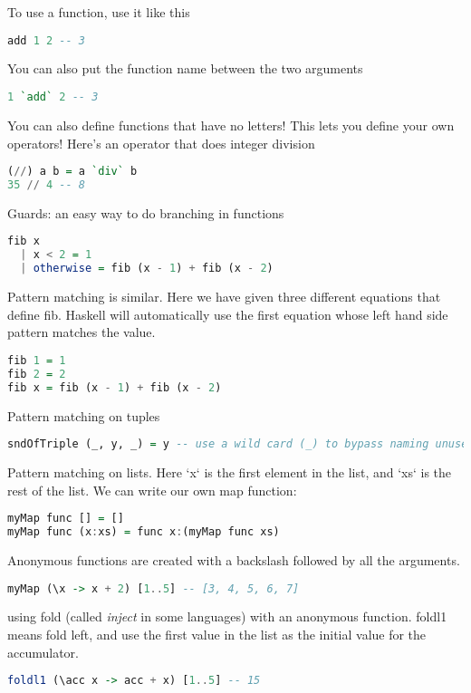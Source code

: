 To use a function, use it like this
\begin{lstlisting}[language=Haskell]
add 1 2 -- 3
\end{lstlisting}

You can also put the function name between the two arguments
\begin{lstlisting}[language=Haskell]
1 `add` 2 -- 3
\end{lstlisting}

You can also define functions that have no letters! This lets
you define your own operators! Here's an operator that does
integer division
\begin{lstlisting}[language=Haskell]
(//) a b = a `div` b
35 // 4 -- 8
\end{lstlisting}

Guards: an easy way to do branching in functions
\begin{lstlisting}[language=Haskell]
fib x
  | x < 2 = 1
  | otherwise = fib (x - 1) + fib (x - 2)
\end{lstlisting}

Pattern matching is similar. Here we have given three different
equations that define fib. Haskell will automatically use the first
equation whose left hand side pattern matches the value.
\begin{lstlisting}[language=Haskell]
fib 1 = 1
fib 2 = 2
fib x = fib (x - 1) + fib (x - 2)
\end{lstlisting}

Pattern matching on tuples
\begin{lstlisting}[language=Haskell]
sndOfTriple (_, y, _) = y -- use a wild card (_) to bypass naming unused value
\end{lstlisting}

Pattern matching on lists. Here `x` is the first element
in the list, and `xs` is the rest of the list. We can write
our own map function:
\begin{lstlisting}[language=Haskell]
myMap func [] = []
myMap func (x:xs) = func x:(myMap func xs)
\end{lstlisting}

Anonymous functions are created with a backslash followed by
all the arguments.
\begin{lstlisting}[language=Haskell]
myMap (\x -> x + 2) [1..5] -- [3, 4, 5, 6, 7]
\end{lstlisting}

using fold (called \textit{inject} in some languages) with an anonymous
function. foldl1 means fold left, and use the first value in the
list as the initial value for the accumulator.
\begin{lstlisting}[language=Haskell]
foldl1 (\acc x -> acc + x) [1..5] -- 15
\end{lstlisting}